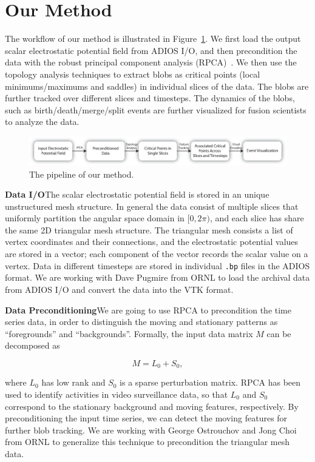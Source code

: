 \section{Our Method}

The workflow of our method is illustrated in Figure~\ref{fig:pipeline}.  
We first load the output scalar electrostatic potential field from ADIOS I/O, and then precondition the data with the robust principal component analysis (RPCA)~\cite{CandesLMW11}.  We then use the topology analysis techniques to extract blobs as critical points (local minimums/maximums and saddles) in individual slices of the data.  The blobs are further tracked over different slices and timesteps.  The dynamics of the blobs, such as birth/death/merge/split events are further visualized for fusion scientists to analyze the data.  


\begin{figure}
  \centering
  \includegraphics[width=\linewidth]{Figs/pipeline}
  \caption{The pipeline of our method.}
  \label{fig:pipeline}
\end{figure}

{\bf Data I/O}\quad The scalar electrostatic potential field is stored in an unique unstructured mesh structure.  In general the data consist of multiple slices that uniformly partition the angular space domain in $[0, 2\pi)$, and each slice has share the same 2D triangular mesh structure.  The triangular mesh consists a list of vertex coordinates and their connections, and the electrostatic potential values are stored in a vector; each component of the vector records the scalar value on a vertex.  Data in different timesteps are stored in individual \texttt{.bp} files in the ADIOS format.  We are working with Dave Pugmire from ORNL to load the archival data from ADIOS I/O and convert the data into the VTK format.  


{\bf Data Preconditioning}\quad We are going to use RPCA to precondition the time series data, in order to distinguish the moving and stationary patterns as ``foregrounds'' and ``backgrounds''.  Formally, the input data matrix $M$ can be decomposed as 

\begin{equation}
M = L_0 + S_0, 
\end{equation}

\noindent where $L_0$ has low rank and $S_0$ is a sparse perturbation matrix.  RPCA has been used to identify activities in video surveillance data, so that $L_0$ and $S_0$ correspond to the stationary background and moving features, respectively.  By preconditioning the input time series, we can detect the moving features for further blob tracking.  We are working with George Ostrouchov and Jong Choi from ORNL to generalize this technique to precondition the triangular mesh data.  


